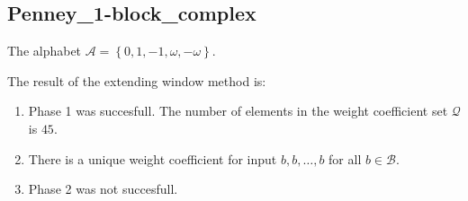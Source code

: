 \subsection{ Penney\_1-block\_complex }

\label{subsec:Penney1-blockcomplex}

The alphabet $\mathcal{A} =\left\{0, 1, -1, \omega, -\omega\right\}$.

\noindent The result of the extending window method is:
\begin{enumerate}
    \item Phase 1 was succesfull.
The number of elements in the weight coefficient set $\mathcal{Q}$ is $45$.

    \item There is a unique weight coefficient for input $b,b,\dots,b$ for all $b\in\mathcal{B}$.

    \item Phase 2 was not succesfull.

\end{enumerate}
